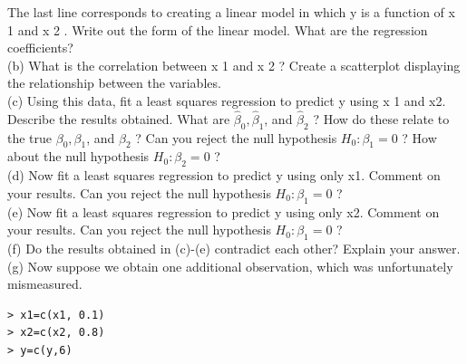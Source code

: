 \documentclass[10pt]{article}
\begin{document}
The last line corresponds to creating a linear model in which y is a function of x 1 and x 2 . Write out the form of the linear model. What are the regression coefficients?\\
(b) What is the correlation between x 1 and x 2 ? Create a scatterplot displaying the relationship between the variables.\\
(c) Using this data, fit a least squares regression to predict y using x 1 and x2. Describe the results obtained. What are $\hat{\beta}_{0}, \hat{\beta}_{1}$, and $\hat{\beta}_{2}$ ? How do these relate to the true $\beta_{0}, \beta_{1}$, and $\beta_{2}$ ? Can you reject the null hypothesis $H_{0}: \beta_{1}=0$ ? How about the null hypothesis $H_{0}: \beta_{2}=0$ ?\\
(d) Now fit a least squares regression to predict y using only x1. Comment on your results. Can you reject the null hypothesis $H_{0}: \beta_{1}=0$ ?\\
(e) Now fit a least squares regression to predict y using only x2. Comment on your results. Can you reject the null hypothesis $H_{0}: \beta_{1}=0$ ?\\
(f) Do the results obtained in (c)-(e) contradict each other? Explain your answer.\\
(g) Now suppose we obtain one additional observation, which was unfortunately mismeasured.

\begin{verbatim}
> x1=c(x1, 0.1)
> x2=c(x2, 0.8)
> y=c(y,6)
\end{verbatim}
\end{document}
